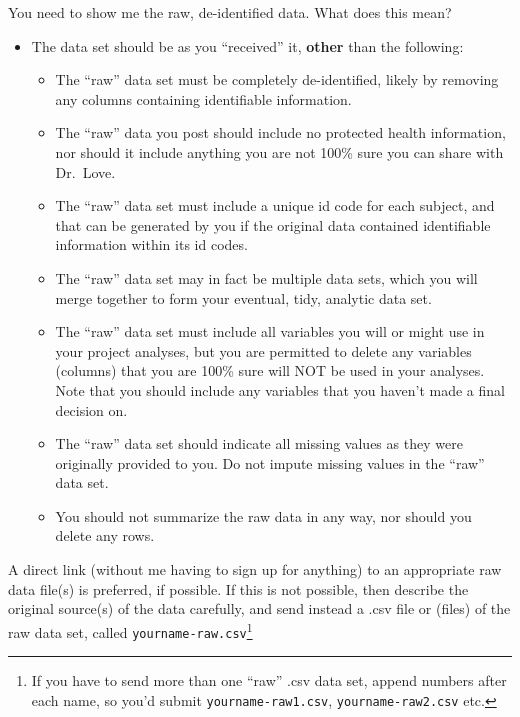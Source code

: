 \documentclass[]{book}
\providecommand{\tightlist}{%
  \setlength{\itemsep}{0pt}\setlength{\parskip}{0pt}}
\let\rmarkdownfootnote\footnote%
\def\footnote{\protect\rmarkdownfootnote}
\theoremstyle{definition}
\theoremstyle{definition}
\theoremstyle{definition}
\theoremstyle{remark}
\begin{document}
You need to show me the raw, de-identified data. What does this mean?

\begin{itemize}
\tightlist
\item
  The data set should be as you ``received'' it, \textbf{other} than the
  following:

  \begin{itemize}
  \tightlist
  \item
    The ``raw'' data set must be completely de-identified, likely by
    removing any columns containing identifiable information.
  \item
    The ``raw'' data you post should include no protected health
    information, nor should it include anything you are not 100\% sure
    you can share with Dr.~Love.
  \item
    The ``raw'' data set must include a unique id code for each subject,
    and that can be generated by you if the original data contained
    identifiable information within its id codes.
  \item
    The ``raw'' data set may in fact be multiple data sets, which you
    will merge together to form your eventual, tidy, analytic data set.
  \item
    The ``raw'' data set must include all variables you will or might
    use in your project analyses, but you are permitted to delete any
    variables (columns) that you are 100\% sure will NOT be used in your
    analyses. Note that you should include any variables that you
    haven't made a final decision on.
  \item
    The ``raw'' data set should indicate all missing values as they were
    originally provided to you. Do not impute missing values in the
    ``raw'' data set.
  \item
    You should not summarize the raw data in any way, nor should you
    delete any rows.
  \end{itemize}
\end{itemize}

A direct link (without me having to sign up for anything) to an
appropriate raw data file(s) is preferred, if possible. If this is not
possible, then describe the original source(s) of the data carefully,
and send instead a .csv file or (files) of the raw data set, called
\texttt{yourname-raw.csv}\footnote{If you have to send more than one
  ``raw'' .csv data set, append numbers after each name, so you'd submit
  \texttt{yourname-raw1.csv}, \texttt{yourname-raw2.csv} etc.}
\end{document}

